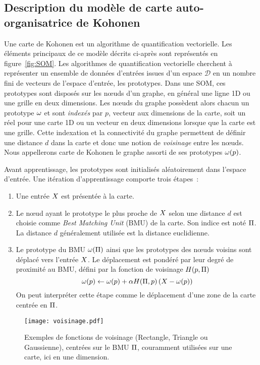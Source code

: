 \documentclass[../main]{subfiles}
\begin{document}
\subsection{Description du modèle de carte auto-organisatrice de Kohonen}

Une carte de Kohonen est un algorithme de quantification vectorielle. 
Les éléments principaux de ce modèle décrits ci-après sont représentés en figure~\ref{fig:SOM}.
Les algorithmes de quantification vectorielle cherchent à représenter un ensemble de données d'entrées issues d'un espace $\mathcal{D}$ en un nombre fini de vecteurs de l'espace d'entrée, les prototypes.
Dans une SOM, ces prototypes sont disposés sur les n\oe{}uds d'un graphe, en général une ligne 1D ou une grille en deux dimensions.
Les n\oe{}uds du graphe possèdent alors chacun un prototype $\omega$ et sont \emph{indexés} par $p$, vecteur aux dimensions de la carte, soit un réel pour une carte 1D ou un vecteur en deux dimensions lorsque que la carte est une grille.
Cette indexation et la connectivité du graphe permettent de définir une distance $d$ dans la carte et donc une notion de \emph{voisinage} entre les n\oe{}uds. Nous appellerons carte de Kohonen le graphe assorti de ses prototypes $\omega(p)$.

Avant apprentissage, les prototypes sont initialisés aléatoirement dans l'espace d'entrée.
Une itération d'apprentissage comporte trois étapes~:
\begin{enumerate}
\item Une entrée $X$ est présentée à la carte.
\item Le n\oe{}ud ayant le prototype le plus proche de $X$ selon une distance $d$ est choisie comme \emph{Best Matching Unit} (BMU) de la carte. Son indice est noté $\Pi$. La distance $d$ généralement utilisée est la distance euclidienne.
\item Le prototype du BMU $\omega(\Pi)$ ainsi que les prototypes des n\oe{}uds voisins sont déplacé vers l'entrée $X$. Le déplacement est pondéré par leur degré de proximité au BMU, défini par la fonction de voisinage $H(p,\Pi)$
$$ \omega(p) \leftarrow \omega(p) + \alpha H(\Pi,p) \left( X - \omega(p)\right)$$
On peut interpréter cette étape comme le déplacement d'une zone de la carte centrée en $\Pi$. 
\end{enumerate}

\begin{figure}
     \centering
     \texttt{[image: voisinage.pdf]}
     \caption{Exemples de fonctions de voisinage (Rectangle, Triangle ou Gaussienne), centrées sur le BMU $\Pi$, couramment utilisées sur une carte, ici en une dimension.}
\end{figure}
\end{document}
